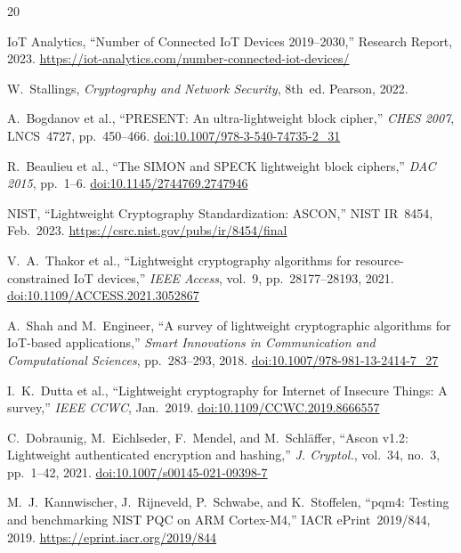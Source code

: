 \documentclass[anonymous]{ndss}
\begin{document}
\balance
\begin{thebibliography}{20}

IoT Analytics, ``Number of Connected IoT Devices 2019--2030,''
Research Report, 2023. \url{https://iot-analytics.com/number-connected-iot-devices/}

W.~Stallings, \textit{Cryptography and Network Security},
8th~ed. Pearson, 2022.

A.~Bogdanov et al., ``PRESENT: An ultra-lightweight block cipher,''
\textit{CHES 2007}, LNCS~4727, pp.~450--466.
\href{https://doi.org/10.1007/978-3-540-74735-2_31}{doi:10.1007/978-3-540-74735-2\_31}

R.~Beaulieu et al., ``The SIMON and SPECK lightweight block ciphers,''
\textit{DAC 2015}, pp.~1--6.
\href{https://doi.org/10.1145/2744769.2747946}{doi:10.1145/2744769.2747946}

NIST, ``Lightweight Cryptography Standardization: ASCON,''
NIST IR~8454, Feb.~2023.
\url{https://csrc.nist.gov/pubs/ir/8454/final}

V.~A.~Thakor et al., ``Lightweight cryptography algorithms for
resource-constrained IoT devices,'' \textit{IEEE Access}, vol.~9,
pp.~28177--28193, 2021.
\href{https://doi.org/10.1109/ACCESS.2021.3052867}{doi:10.1109/ACCESS.2021.3052867}

A.~Shah and M.~Engineer, ``A survey of lightweight cryptographic
algorithms for IoT-based applications,'' \textit{Smart Innovations
in Communication and Computational Sciences}, pp.~283--293, 2018.
\href{https://doi.org/10.1007/978-981-13-2414-7_27}{doi:10.1007/978-981-13-2414-7\_27}

I.~K.~Dutta et al., ``Lightweight cryptography for Internet of Insecure
Things: A survey,'' \textit{IEEE CCWC}, Jan.~2019.
\href{https://doi.org/10.1109/CCWC.2019.8666557}{doi:10.1109/CCWC.2019.8666557}

C.~Dobraunig, M.~Eichlseder, F.~Mendel, and M.~Schl{\"a}ffer,
``Ascon v1.2: Lightweight authenticated encryption and hashing,''
\textit{J. Cryptol.}, vol.~34, no.~3, pp.~1--42, 2021.
\href{https://doi.org/10.1007/s00145-021-09398-7}{doi:10.1007/s00145-021-09398-7}

M.~J.~Kannwischer, J.~Rijneveld, P.~Schwabe, and K.~Stoffelen,
``pqm4: Testing and benchmarking NIST PQC on ARM Cortex-M4,''
IACR ePrint~2019/844, 2019.
\url{https://eprint.iacr.org/2019/844}


\end{thebibliography}
\end{document}
